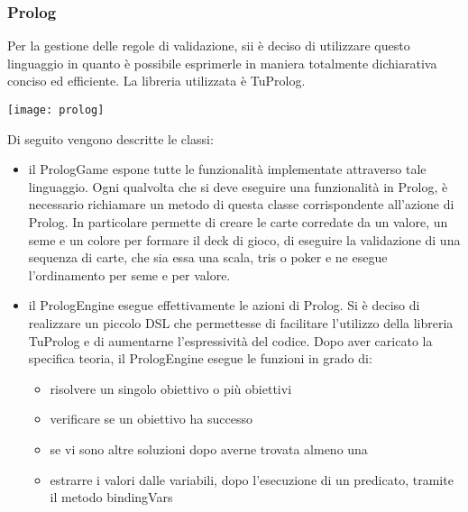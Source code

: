 \subsubsection{Prolog}
Per la gestione delle regole di validazione, sii è deciso di utilizzare questo linguaggio in quanto è possibile esprimerle in maniera totalmente dichiarativa conciso ed efficiente.
La libreria utilizzata è TuProlog.
\begin{center}
    \texttt{[image: prolog]}
\end{center}
Di seguito vengono descritte le classi:
\begin{itemize}
    \item il PrologGame espone tutte le funzionalità implementate attraverso tale linguaggio.
    Ogni qualvolta che si deve eseguire una funzionalità in Prolog, è necessario richiamare un metodo di questa classe corrispondente all’azione di Prolog.
    In particolare permette di creare le carte corredate da un valore, un seme e un colore per formare il deck di gioco, di eseguire la validazione di una sequenza di carte, che sia essa una scala, tris o poker e ne esegue l’ordinamento per seme e per valore.

    \item il PrologEngine esegue effettivamente le azioni di Prolog.
    Si è deciso di realizzare un piccolo DSL che permettesse di facilitare l’utilizzo della libreria TuProlog e di aumentarne l’espressività del codice.
    Dopo aver caricato la specifica teoria, il PrologEngine esegue le funzioni in grado di:
    \begin{itemize}
        \item risolvere un singolo obiettivo o più obiettivi
        \item verificare se un obiettivo ha successo
        \item se vi sono altre soluzioni dopo averne trovata almeno una
        \item estrarre i valori dalle variabili, dopo l’esecuzione di un predicato, tramite il metodo bindingVars
    \end{itemize}


\end{itemize}
